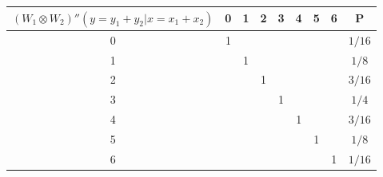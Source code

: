 \begin{tabular}{c|c|c|c|c|c|c|c||c|}
$(W_1 \otimes W_2)''(y = y_1+y_2 | x = x_1 + x_2)$ & 0 & 1 & 2 & 3 & 4 & 5 & 6 & P      \\ \hline
0                     & 1 &   &   &   &   &   &   & $1/16$ \\ \hline
1                     &   & 1 &   &   &   &   &   & $1/8$  \\ \hline
2                     &   &   & 1 &   &   &   &   & $3/16$ \\ \hline
3                     &   &   &   & 1 &   &   &   & $1/4$  \\ \hline
4                     &   &   &   &   & 1 &   &   & $3/16$ \\ \hline
5                     &   &   &   &   &   & 1 &   & $1/8$  \\ \hline
6                     &   &   &   &   &   &   & 1 & $1/16$ \\ \hline
\end{tabular}
